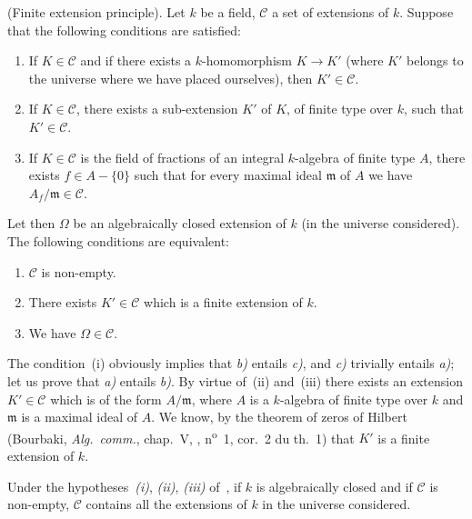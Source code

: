 \begin{proposition}[9.1.1]
\label{IV.9.1.1}
\textnormal{(Finite extension principle).}
Let $k$ be a field, $\mathcal{C}$ a set of extensions of $k$.
Suppose that the following conditions are satisfied:
\begin{enumerate}[label=(\roman*)]
  \item If $K\in\mathcal{C}$ and if there exists a $k$-homomorphism $K\to K'$ (where $K'$ belongs to the universe where we have placed ourselves), then $K'\in\mathcal{C}$.
  \item If $K\in\mathcal{C}$, there exists a sub-extension $K'$ of $K$, of finite type over $k$, such that $K'\in\mathcal{C}$.
  \item If $K\in\mathcal{C}$ is the field of fractions of an integral $k$-algebra of finite type $A$, there exists $f\in A-\{0\}$ such that for every maximal ideal $\mathfrak{m}$ of $A$ we have $A_f/\mathfrak{m}\in\mathcal{C}$.
\end{enumerate}

Let then $\Omega$ be an algebraically closed extension of $k$ (in the universe considered).
The following conditions are equivalent:
\begin{enumerate}[label=\emph{\alph*)}]
  \item $\mathcal{C}$ is non-empty.
  \item There exists $K'\in\mathcal{C}$ which is a finite extension of $k$.
  \item We have $\Omega\in\mathcal{C}$.
\end{enumerate}
\end{proposition}

The condition~(i) obviously implies that \emph{b)} entails \emph{c)}, and \emph{c)} trivially entails \emph{a)};
let us prove that \emph{a)} entails \emph{b)}.
By virtue of~(ii) and~(iii) there exists an extension $K'\in\mathcal{C}$ which is of the form $A/\mathfrak{m}$, where $A$ is a $k$-algebra of finite type over $k$ and $\mathfrak{m}$ is a maximal ideal of $A$.
We know, by the theorem of zeros of Hilbert (Bourbaki, \emph{Alg.\ comm.}, chap.~V, , n\textsuperscript{o}~1, cor.~2 du th.~1) that $K'$ is a finite extension of $k$.


\begin{corollary}[9.1.2]
\label{IV.9.1.2}
Under the hypotheses~\emph{(i)}, \emph{(ii)}, \emph{(iii)} of~, if $k$ is algebraically closed and if $\mathcal{C}$ is non-empty, $\mathcal{C}$ contains all the extensions of $k$ in the universe considered.
\end{corollary}

